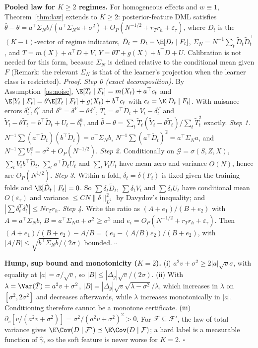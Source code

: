 \textbf{Pooled law for $K\ge2$ regimes.} For homogeneous effects and $w\equiv1$, Theorem~\ref{thm:law} extends to $K\ge2$: posterior-feature DML satisfies $\hat\theta-\theta=a^\top\Sigma_Nb/(a^\top\Sigma_Na+\sigma^2)+O_P(N^{-1/2}+r_Tr_h+\varepsilon_\tau)$, where $D_t$ is the $(K{-}1)$-vector of regime indicators, $\tilde D_t=D_t-\E[D_t\mid F_t]$, $\Sigma_N=N^{-1}\sum_t\tilde D_t\tilde D_t^\top$, and $T=m(X)+a^\top D+V$, $Y=\theta T+g(X)+b^\top D+U$. Calibration is not needed for this form, because $\Sigma_N$ is defined relative to the conditional mean given $F$ (Remark: the relevant $\Sigma_N$ is that of the learner's projection when the learner class is restricted).
\emph{Proof.} \emph{Step 0 (exact decomposition).} By Assumption~\ref{as:noise}, $\E[T_t\mid F_t]=m(X_t)+a^\top c_t$ and $\E[Y_t\mid F_t]=\theta\E[T_t\mid F_t]+g(X_t)+b^\top c_t$ with $c_t=\E[D_t\mid F_t]$. With nuisance errors $\delta^T_t,\delta^Y_t$ and $\delta^h=\delta^Y-\theta\delta^T$, $\tilde T_t=a^\top\tilde D_t+V_t-\delta^T_t$ and $\tilde Y_t-\theta\tilde T_t=b^\top\tilde D_t+U_t-\delta^h_t$, and $\hat\theta-\theta=\sum_t\tilde T_t(\tilde Y_t-\theta\tilde T_t)/\sum_t\tilde T_t^2$ exactly.
\emph{Step 1.} $N^{-1}\sum(a^\top\tilde D_t)(b^\top\tilde D_t)=a^\top\Sigma_Nb$, $N^{-1}\sum(a^\top\tilde D_t)^2=a^\top\Sigma_Na$, and $N^{-1}\sum V_t^2=\sigma^2+O_P(N^{-1/2})$.
\emph{Step 2.} Conditionally on $\mathcal G=\sigma(S,Z,X)$, $\sum_tV_tb^\top\tilde D_t$, $\sum_ta^\top\tilde D_tU_t$ and $\sum_tV_tU_t$ have mean zero and variance $O(N)$, hence are $O_P(N^{1/2})$.
\emph{Step 3.} Within a fold, $\delta_t=\delta(F_t)$ is fixed given the training folds and $\E[\tilde D_t\mid F_t]=0$. So $\sum\delta_t\tilde D_t$, $\sum\delta_tV_t$ and $\sum\delta_tU_t$ have conditional mean $O(\varepsilon_\tau)$ and variance $\le CN\|\delta\|^2_{L^2}$ by Davydov's inequality; and $|\sum\delta^T_t\delta^h_t|\le Nr_Tr_h$.
\emph{Step 4.} Write the ratio as $(A+e_1)/(B+e_2)$ with $A=a^\top\Sigma_Nb$, $B=a^\top\Sigma_Na+\sigma^2\ge\sigma^2$ and $e_i=O_P(N^{-1/2}+r_Tr_h+\varepsilon_\tau)$. Then $(A+e_1)/(B+e_2)-A/B=(e_1-(A/B)e_2)/(B+e_2)$, with $|A/B|\le\sqrt{b^\top\Sigma_Nb}/(2\sigma)$ bounded. $\square$

\textbf{Hump, sup bound and monotonicity ($K=2$).} (i) $a^2v+\sigma^2\ge2|a|\sqrt v\sigma$, with equality at $|a|=\sigma/\sqrt v$, so $|B|\le|\Delta_g|\sqrt v/(2\sigma)$. (ii) With $\lambda=\Var(\tilde T)=a^2v+\sigma^2$, $|B|=|\Delta_g|\sqrt v\sqrt{\lambda-\sigma^2}/\lambda$, which increases in $\lambda$ on $[\sigma^2,2\sigma^2]$ and decreases afterwards, while $\lambda$ increases monotonically in $|a|$. Conditioning therefore cannot be a monotone certificate. (iii) $\partial_v[v/(a^2v+\sigma^2)]=\sigma^2/(a^2v+\sigma^2)^2>0$. For $\mathcal F\subseteq\mathcal F'$, the law of total variance gives $\E\Cov(D\mid\mathcal F')\preceq\E\Cov(D\mid\mathcal F)$; a hard label is a measurable function of $\hat\gamma$, so the soft feature is never worse for $K=2$. $\square$

